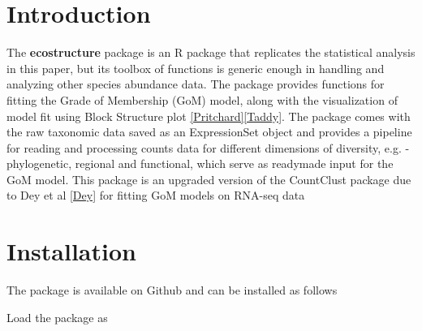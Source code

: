 \documentclass[12pt]{article}
\begin{document}
\maketitle

\section{Introduction}

The \textbf{ecostructure} package is an R package that replicates the statistical analysis in this paper, but its toolbox of functions is generic enough in handling and analyzing other species abundance data. The package provides functions for fitting the Grade of Membership (GoM) model, along with the visualization of model fit using Block Structure plot \ref{Pritchard}\ref{Taddy}. The package comes with the raw taxonomic data saved as an ExpressionSet object and provides a pipeline for reading and processing counts data for different dimensions of diversity, e.g. - phylogenetic, regional and functional, which serve as readymade input for the GoM model. This package is an upgraded version of the CountClust package due to Dey et al \ref{Dey} for fitting GoM models on RNA-seq data

\section{Installation}

The package is available on Github and can be installed as follows



\begin{knitrout}
\color{fgcolor}\begin{kframe}
\begin{alltt}
\hlstd{(}\hlstd{)}
\end{alltt}
\end{kframe}
\end{knitrout}

Load the package as
\end{document}
